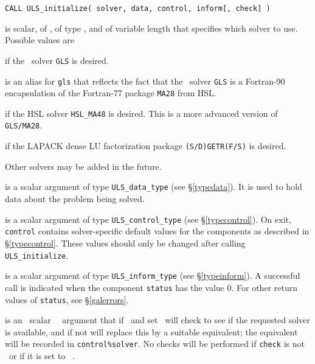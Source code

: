 \documentclass{galahad}
\newcommand{\packagename}{ULS}
\begin{document}
\hskip0.5in
{\tt CALL \packagename\_initialize( solver, data, control, inform[, check] )}
\begin{description}

 is scalar, of \intentin, of type \character, and of variable
length that specifies which solver to use. Possible values are
\begin{description}
 if the \galahad\ solver {\tt GLS} is desired.

 is an alias for {\tt gls} that reflects the fact that the \galahad\
 solver {\tt GLS} is a Fortran-90 encapsulation of the Fortran-77
 package {\tt MA28} from HSL.

 if the HSL solver {\tt HSL\_MA48} is desired. This is a more
advanced version of {\tt GLS/MA28}.

 if the LAPACK dense LU factorization package
{\tt (S/D)GETR(F/S)} is desired.




\end{description}
Other solvers may be added in the future.

 is a scalar \intentout argument of type
{\tt \packagename\_data\_type}
(see \S\ref{typedata}). It is used to hold data about the problem being
solved.

 is a scalar \intentout argument of type
{\tt \packagename\_control\_type}
(see \S\ref{typecontrol}).
On exit, {\tt control} contains solver-specific default values for the
components as described in \S\ref{typecontrol}.
These values should only be changed after calling
{\tt \packagename\_initialize}.

 is a scalar \intentout argument of type
{\tt \packagename\_inform\_type}
(see \S\ref{typeinform}).
A successful call is indicated when the  component {\tt status} has the value 0.
For other return values of {\tt status}, see \S\ref{galerrors}.

 is an \optional\ scalar \logical\ \intentin\ argument 
that if \present\ and set \true\ will check to see if the requested solver 
is available, and if not will replace this by a suitable equivalent; the 
equivalent will be recorded in {\tt control\%solver}. 
No checks will be performed if {\tt check} is not \present\ or if it is set
to \false\ .

\end{description}
\end{document}
